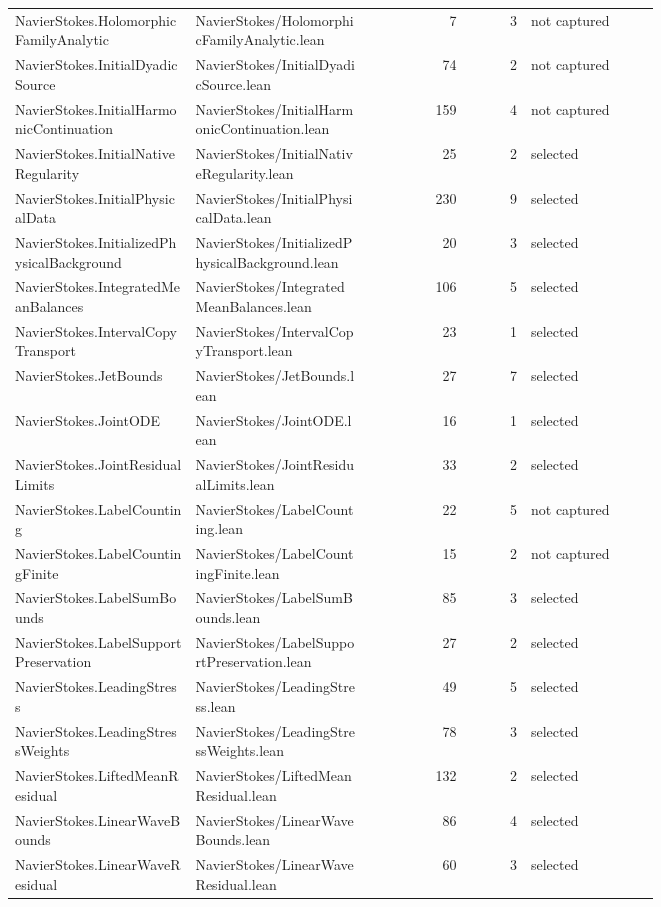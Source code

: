 \documentclass[10pt]{article}
\begin{document}
\begin{longtable}{p{0.28\linewidth}p{0.27\linewidth}r r p{0.20\linewidth}}
NavierStokes.HolomorphicFamilyAnalytic & NavierStokes/HolomorphicFamilyAnalytic.lean & 7 & 3 & not captured\\
NavierStokes.InitialDyadicSource & NavierStokes/InitialDyadicSource.lean & 74 & 2 & not captured\\
NavierStokes.InitialHarmonicContinuation & NavierStokes/InitialHarmonicContinuation.lean & 159 & 4 & not captured\\
NavierStokes.InitialNativeRegularity & NavierStokes/InitialNativeRegularity.lean & 25 & 2 & selected\\
NavierStokes.InitialPhysicalData & NavierStokes/InitialPhysicalData.lean & 230 & 9 & selected\\
NavierStokes.InitializedPhysicalBackground & NavierStokes/InitializedPhysicalBackground.lean & 20 & 3 & selected\\
NavierStokes.IntegratedMeanBalances & NavierStokes/IntegratedMeanBalances.lean & 106 & 5 & selected\\
NavierStokes.IntervalCopyTransport & NavierStokes/IntervalCopyTransport.lean & 23 & 1 & selected\\
NavierStokes.JetBounds & NavierStokes/JetBounds.lean & 27 & 7 & selected\\
NavierStokes.JointODE & NavierStokes/JointODE.lean & 16 & 1 & selected\\
NavierStokes.JointResidualLimits & NavierStokes/JointResidualLimits.lean & 33 & 2 & selected\\
NavierStokes.LabelCounting & NavierStokes/LabelCounting.lean & 22 & 5 & not captured\\
NavierStokes.LabelCountingFinite & NavierStokes/LabelCountingFinite.lean & 15 & 2 & not captured\\
NavierStokes.LabelSumBounds & NavierStokes/LabelSumBounds.lean & 85 & 3 & selected\\
NavierStokes.LabelSupportPreservation & NavierStokes/LabelSupportPreservation.lean & 27 & 2 & selected\\
NavierStokes.LeadingStress & NavierStokes/LeadingStress.lean & 49 & 5 & selected\\
NavierStokes.LeadingStressWeights & NavierStokes/LeadingStressWeights.lean & 78 & 3 & selected\\
NavierStokes.LiftedMeanResidual & NavierStokes/LiftedMeanResidual.lean & 132 & 2 & selected\\
NavierStokes.LinearWaveBounds & NavierStokes/LinearWaveBounds.lean & 86 & 4 & selected\\
NavierStokes.LinearWaveResidual & NavierStokes/LinearWaveResidual.lean & 60 & 3 & selected\\

\end{longtable}
\end{document}
